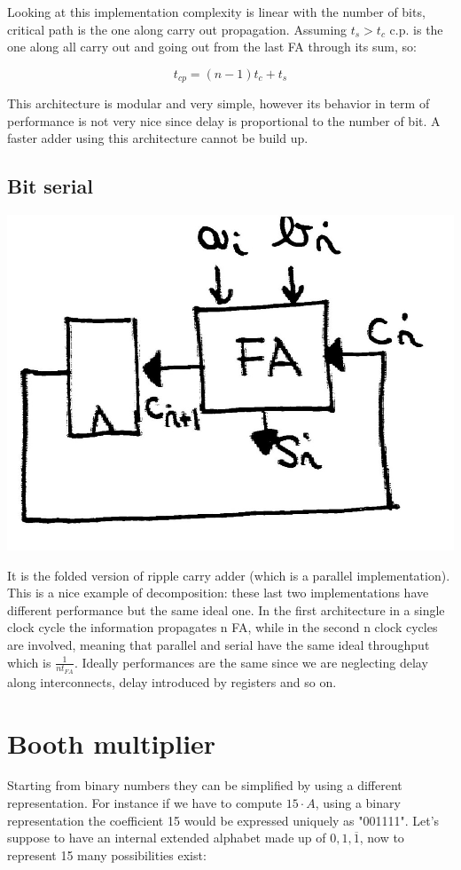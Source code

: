 Looking at this implementation complexity is linear with the number of bits, critical path is the one along carry out propagation. Assuming $t_s>t_c$ c.p. is the one along all carry out and going out from the last FA through its sum, so:

$$t_{cp}=(n-1)t_c+t_s$$

This architecture is modular and very simple, however its behavior in term of performance is not very nice since delay is proportional to the number of bit. A faster adder using this architecture cannot be build up.

\subsection{Bit serial}
\begin{center}
  \includegraphics[width=0.5\linewidth]{img/img2/3}
\end{center}
It is the folded version of ripple carry adder (which is a parallel implementation). This is a nice example of decomposition: these last two implementations have different performance but the same ideal one. In the first architecture in a single clock cycle the information propagates n FA, while in the second n clock cycles are involved, meaning that parallel and serial have the same ideal throughput which is $\frac{1}{nt_{FA}}$.
Ideally performances are the same since we are neglecting delay along interconnects, delay introduced by registers and so on.
\section{Booth multiplier}

Starting from binary numbers they can be simplified by using a different representation. For instance if we have to compute  $15 \cdot A$, using a binary representation the coefficient 15 would be expressed uniquely as "001111". Let's suppose to have an internal extended alphabet made up of ${0,1,\overline{1}}$, now to represent 15 many possibilities exist:

